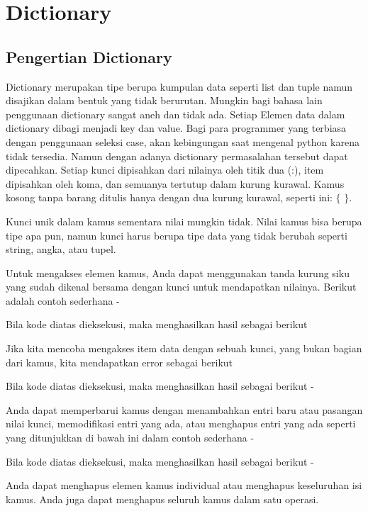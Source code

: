 \section{Dictionary}
\subsection{Pengertian Dictionary}
Dictionary merupakan tipe berupa kumpulan data seperti list dan tuple namun disajikan dalam bentuk yang tidak berurutan. Mungkin bagi bahasa lain penggunaan 
dictionary sangat aneh dan tidak ada. Setiap Elemen data dalam dictionary dibagi menjadi key dan value. Bagi para programmer yang terbiasa dengan penggunaan seleksi case, akan kebingungan saat mengenal 
python karena tidak tersedia. Namun dengan adanya dictionary permasalahan tersebut dapat dipecahkan.
Setiap kunci dipisahkan dari nilainya oleh titik dua (:), item dipisahkan oleh koma, dan semuanya tertutup dalam kurung kurawal. Kamus kosong tanpa barang ditulis hanya dengan dua kurung kurawal, seperti ini:  $  \{  $ $  \}  $. \par

Kunci unik dalam kamus sementara nilai mungkin tidak. Nilai kamus bisa berupa tipe apa pun, namun kunci harus berupa tipe data yang tidak berubah seperti string, angka, atau tupel. \par

Untuk mengakses elemen kamus, Anda dapat menggunakan tanda kurung siku yang sudah dikenal bersama dengan kunci untuk mendapatkan nilainya. Berikut adalah contoh sederhana - \par

Bila kode diatas dieksekusi, maka menghasilkan hasil sebagai berikut 

Jika kita mencoba mengakses item data dengan sebuah kunci, yang bukan bagian dari kamus, kita mendapatkan error sebagai berikut 

Bila kode diatas dieksekusi, maka menghasilkan hasil sebagai berikut - 

Anda dapat memperbarui kamus dengan menambahkan entri baru atau pasangan nilai kunci, memodifikasi entri yang ada, atau menghapus entri yang ada seperti yang ditunjukkan di bawah ini dalam contoh sederhana - \par

Bila kode diatas dieksekusi, maka menghasilkan hasil sebagai berikut - \par

Anda dapat menghapus elemen kamus individual atau menghapus keseluruhan isi kamus. Anda juga dapat menghapus seluruh kamus dalam satu operasi.

